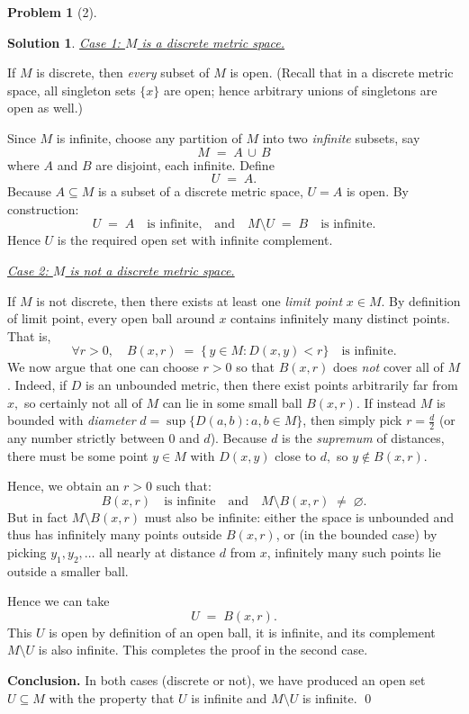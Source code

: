 \documentclass[12pt]{article}
\theoremstyle{definition} %
\newtheorem{solution}{Solution}
\newtheorem{problem}{Problem}
\theoremstyle{plain} %
\begin{document}
\begin{problem}[2]
    
\end{problem}
\begin{solution}
    \medskip
\noindent
\underline{\textit{Case 1: $M$ is a \emph{discrete} metric space.}}

\smallskip
\noindent
If $M$ is discrete, then \emph{every} subset of $M$ is open.  (Recall that in a discrete metric space, all singleton sets $\{x\}$ are open; hence arbitrary unions of singletons are open as well.)

Since $M$ is infinite, choose any partition of $M$ into two \emph{infinite} subsets, say
\[
  M \;=\; A \,\cup\, B
\]
where $A$ and $B$ are disjoint, each infinite.  Define
\[
  U \;=\; A.
\]
Because $A\subseteq M$ is a subset of a discrete metric space, $U=A$ is open.  By construction:
\[
  U \;=\; A \quad\text{is infinite,}
  \quad\text{and}\quad
  M\setminus U \;=\; B \quad\text{is infinite.}
\]
Hence $U$ is the required open set with infinite complement.

\bigskip
\noindent
\underline{\textit{Case 2: $M$ is \emph{not} a discrete metric space.}}

\smallskip
\noindent
If $M$ is not discrete, then there exists at least one \emph{limit point} $x \in M$.  By definition of limit point, every open ball around $x$ contains infinitely many distinct points.  That is,
\[
  \forall r>0,\quad B(x,r) \;=\; \{\,y\in M : D(x,y)<r\}
  \quad\text{is infinite.}
\]
We now argue that one can choose $r>0$ so that $B(x,r)$ does \emph{not} cover all of $M$.  Indeed, if $D$ is an unbounded metric, then there exist points arbitrarily far from $x,$ so certainly not all of $M$ can lie in some small ball $B(x,r).$  If instead $M$ is bounded with \emph{diameter} $d = \sup\{D(a,b) : a,b\in M\}$, then simply pick $r = \tfrac{d}{2}$ (or any number strictly between $0$ and $d$).  Because $d$ is the \emph{supremum} of distances, there must be some point $y\in M$ with $D(x,y)$ close to $d,$ so $y\notin B(x,r).$

Hence, we obtain an $r>0$ such that:
\[
  B(x,r)\quad\text{is infinite}
  \quad\text{and}\quad
  M \setminus B(x,r)\;\neq\;\varnothing.
\]
But in fact $M \setminus B(x,r)$ must also be infinite: either the space is unbounded and thus has infinitely many points outside $B(x,r)$, or (in the bounded case) by picking $y_1,y_2,\dots$ all nearly at distance $d$ from $x$, infinitely many such points lie outside a smaller ball.

Hence we can take
\[
  U \;=\; B(x,r).
\]
This $U$ is open by definition of an open ball, it is infinite, and its complement $M\setminus U$ is also infinite.  This completes the proof in the second case.

\medskip
\noindent
\textbf{Conclusion.} In both cases (discrete or not), we have produced an open set
$U \subseteq M$ with the property that $U$ is infinite and $M \setminus U$ is infinite.
\qed
\end{solution}
\end{document}
